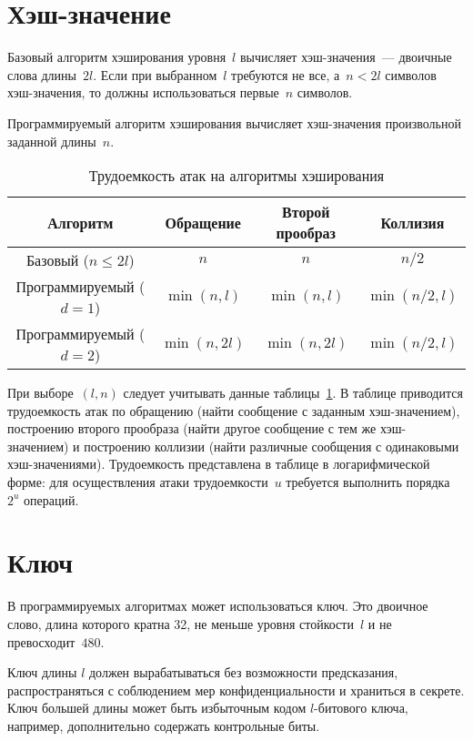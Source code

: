\section{Хэш-значение}\label{COMMON.Hash}

Базовый алгоритм хэширования уровня~$l$ вычисляет хэш-значения~---
двоичные слова длины~$2l$. 
%
Если при выбранном~$l$ требуются не все, а~$n<2l$ символов 
хэш-значения, то должны использоваться первые~$n$ символов.

Программируемый алгоритм хэширования вычисляет хэш-значения 
произвольной заданной длины~$n$.

\begin{table}[hbt]
\caption{Трудоемкость атак на алгоритмы хэширования}\label{Table.COMMON.Hash}
\begin{tabular}{|c|c|c|c|}
\hline
Алгоритм & Обращение & Второй прообраз & Коллизия\\
\hline
\hline
Базовый ($n\leq 2l$) & $n$ & $n$ & $n/2$\\
Программируемый ($d=1$) & $\min(n,l)$ & $\min(n,l)$ & $\min(n/2,l)$\\
Программируемый ($d=2$) & $\min(n,2l)$ & $\min(n,2l)$ & $\min(n/2,l)$\\
\hline
\end{tabular}
\end{table}

При выборе~$(l,n)$ следует учитывать данные таблицы~\ref{Table.COMMON.Hash}.
В таблице приводится трудоемкость атак по 
обращению (найти сообщение с заданным хэш-значением),
построению второго прообраза (найти другое сообщение с тем же хэш-значением)
и построению коллизии (найти различные сообщения с одинаковыми хэш-значениями).
%
Трудоемкость представлена в таблице в логарифмической форме:
для осуществления атаки трудоемкости~$u$ требуется выполнить порядка~$2^u$ 
операций.

\section{Ключ}\label{COMMON.Key}

В программируемых алгоритмах может использоваться ключ.
%
Это двоичное слово, длина которого кратна 32, не меньше уровня стойкости~$l$ 
и не превосходит~$480$. 

Ключ длины $l$ должен вырабатываться без возможности предсказания, 
распространяться с соблюдением мер конфиденциальности и храниться в секрете.
%
Ключ большей длины может быть избыточным кодом $l$-битового 
ключа, например, дополнительно содержать контрольные биты.


